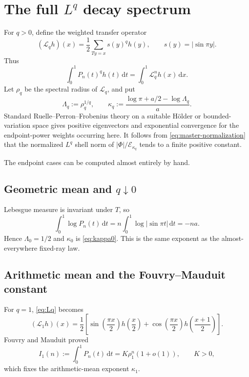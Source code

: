 \documentclass[11pt]{article}
\theoremstyle{definition}
\theoremstyle{remark}
\newcommand{\dd}{\,\mathrm d}
\newcommand{\T}{T}
\newcommand{\Lop}{\mathcal L}
\newcommand{\Ecal}{\mathcal E}
\begin{document}
\section{The full \texorpdfstring{\(L^q\)}{Lq} decay spectrum}
\label{sec:q-spectrum}

For \(q>0\), define the weighted transfer operator
\begin{equation}
 (\Lop_qh)(x)=\frac12\sum_{\T y=x}s(y)^q h(y),
 \qquad s(y)=|\sin\pi y|.
 \label{eq:Lq}
\end{equation}
Thus
\begin{equation}
 \int_0^1P_n(t)^qh(t)\dd t
 =\int_0^1\Lop_q^nh(x)\dd x.
 \label{eq:Lq-integral}
\end{equation}
Let \(\rho_q\) be the spectral radius of \(\Lop_q\), and put
\begin{equation}
 \Lambda_q:=\rho_q^{1/q},
 \qquad
 \kappa_q:=\frac{\log\pi+a/2-\log\Lambda_q}{a}.
 \label{eq:kappa-q}
\end{equation}
Standard Ruelle--Perron--Frobenius theory on a suitable H\"older or
bounded-variation space\cite{baladi} gives positive eigenvectors and exponential
convergence for the endpoint-power weights occurring here.  It follows from
\eqref{eq:master-normalization} that the normalized \(L^q\) shell norm of
\(|\Phi|/\Ecal_{\kappa_q}\) tends to a finite positive constant.

The endpoint cases can be computed almost entirely by hand.

\subsection{Geometric mean and \texorpdfstring{\(q\downarrow0\)}{q to 0}}

Lebesgue measure is invariant under \(\T\), so
\begin{equation}
 \int_0^1\log P_n(t)\dd t
 =n\int_0^1\log|\sin\pi t|\dd t=-na.
 \label{eq:geometric-mean}
\end{equation}
Hence \(\Lambda_0=1/2\) and \(\kappa_0\) is \eqref{eq:kappa0}.  This is the
same exponent as the almost-everywhere fixed-ray law.

\subsection{Arithmetic mean and the Fouvry--Mauduit constant}

For \(q=1\), \eqref{eq:Lq} becomes
\begin{equation}
 (\Lop_1h)(x)=\frac12\left[
 \sin\!\left(\frac{\pi x}{2}\right)h\!\left(\frac x2\right)
 +\cos\!\left(\frac{\pi x}{2}\right)h\!\left(\frac{x+1}{2}\right)
 \right].
 \label{eq:L1}
\end{equation}
Fouvry and Mauduit proved\cite{fouvrymauduit,ahl2017}
\begin{equation}
 I_1(n):=\int_0^1P_n(t)\dd t
 =K\rho_1^n(1+o(1)),
 \qquad K>0,
 \label{eq:FM}
\end{equation}
which fixes the arithmetic-mean exponent \(\kappa_1\).
\end{document}
